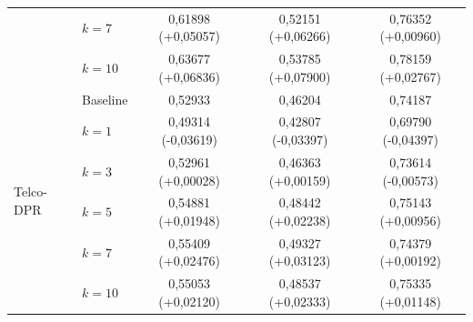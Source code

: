 \begin{table}[htbp]
{\begin{tabular}{llccc}
 & $k=7$ & 0,61898 (+0,05057) & 0,52151 (+0,06266) & 0,76352 (+0,00960) \\
 & $k=10$ & 0,63677 (+0,06836) & 0,53785 (+0,07900) & 0,78159 (+0,02767) \\
\hline
\multirow{6}{*}{Telco-DPR} & Baseline & 0,52933 & 0,46204 & 0,74187 \\
 & $k=1$ & 0,49314 (-0,03619) & 0,42807 (-0,03397) & 0,69790 (-0,04397) \\
 & $k=3$ & 0,52961 (+0,00028) & 0,46363 (+0,00159) & 0,73614 (-0,00573) \\
 & $k=5$ & 0,54881 (+0,01948) & 0,48442 (+0,02238) & 0,75143 (+0,00956) \\
 & $k=7$ & 0,55409 (+0,02476) & 0,49327 (+0,03123) & 0,74379 (+0,00192) \\
 & $k=10$ & 0,55053 (+0,02120) & 0,48537 (+0,02333) & 0,75335 (+0,01148) \\
\hline
\end{tabular}
}
\end{table}

